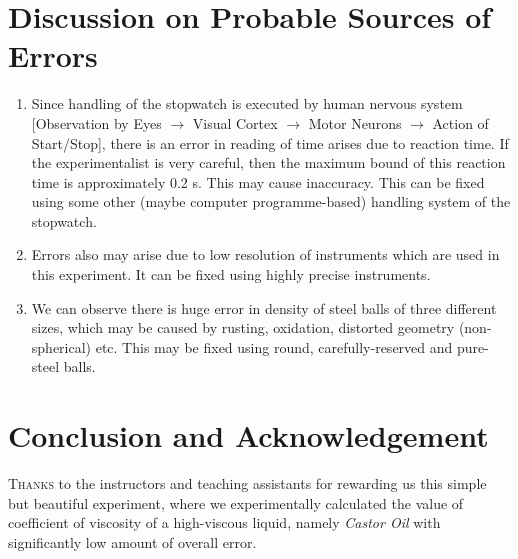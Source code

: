 \documentclass[11pt, a4paper, abstract=true]{scrartcl}
\begin{document}
\section{Discussion on Probable Sources of Errors}
\begin{enumerate}
    \item Since handling of the stopwatch is executed by human nervous system [Observation by Eyes \(\rightarrow\) Visual Cortex \(\rightarrow\) Motor Neurons \(\rightarrow\) Action of Start/Stop], there is an error in reading of time arises due to reaction time. If the experimentalist is very careful, then the maximum bound of this reaction time is approximately 0.2 s. This may cause inaccuracy. This can be fixed using some other (maybe computer programme-based) handling system of the stopwatch.
    \item Errors also may arise due to low resolution of instruments which are used in this experiment. It can be fixed using highly precise instruments.
    \item We can observe there is huge error in density of steel balls of three different sizes, which may be caused by rusting, oxidation, distorted geometry (non-spherical) etc. This may be fixed using round, carefully-reserved and pure-steel balls.
\end{enumerate}
\section{Conclusion and Acknowledgement}
\textsc{Thanks} to the instructors and teaching assistants for rewarding us this simple but beautiful experiment, where we experimentally calculated the value of coefficient of viscosity of a high-viscous liquid, namely \emph{Castor Oil} with significantly low amount of overall error.
\end{document}
